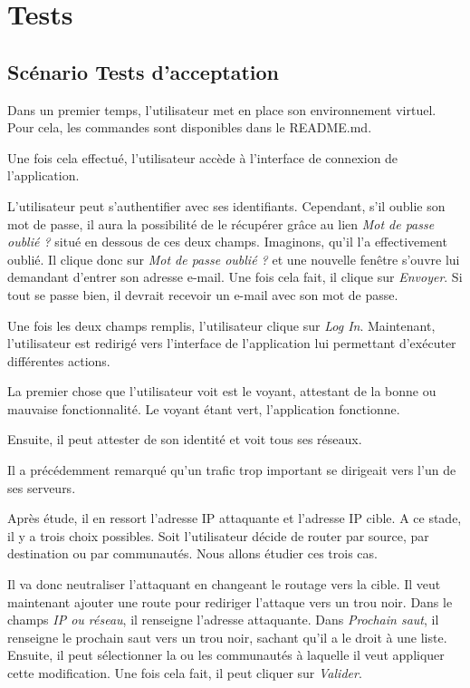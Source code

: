 \chapter{Tests}

\section{Scénario Tests d'acceptation}
Dans un premier temps, l'utilisateur met en place son environnement virtuel. Pour cela, les commandes sont disponibles dans le README.md. 

Une fois cela effectué, l'utilisateur accède à l'interface de connexion de l'application.

L'utilisateur peut s'authentifier avec ses identifiants. Cependant, s'il oublie son mot de passe, il aura la possibilité de le récupérer grâce au lien \textit{Mot de passe oublié ?} situé en dessous de ces deux champs. Imaginons, qu'il l'a effectivement oublié. Il clique donc sur \textit{Mot de passe oublié ?} et une nouvelle fenêtre s'ouvre lui demandant d'entrer son adresse e-mail. Une fois cela fait, il clique sur \textit{Envoyer}. Si tout se passe bien, il devrait recevoir un e-mail avec son mot de passe.

Une fois les deux champs remplis, l'utilisateur clique sur \textit{Log In}. Maintenant, l'utilisateur est redirigé vers l'interface de l'application lui permettant d'exécuter différentes actions. 

La premier chose que l'utilisateur voit est le voyant, attestant de la bonne ou mauvaise fonctionnalité. Le voyant étant vert, l'application fonctionne.

Ensuite, il peut attester de son identité et voit tous ses réseaux.

Il a précédemment remarqué qu'un trafic trop important se dirigeait vers l'un de ses serveurs. 

Après étude, il en ressort l'adresse IP attaquante et l'adresse IP cible. A ce stade, il y a trois choix possibles. Soit l'utilisateur décide de router par source, par destination ou par communautés. Nous allons étudier ces trois cas.

Il va donc neutraliser l'attaquant en changeant le routage vers la cible. Il veut maintenant ajouter une route pour rediriger l'attaque vers un trou noir. Dans le champs \textit{IP ou réseau}, il renseigne l'adresse attaquante. Dans \textit{Prochain saut}, il renseigne le prochain saut vers un trou noir, sachant qu'il a le droit à une liste. Ensuite, il peut sélectionner la ou les communautés à laquelle il veut appliquer cette modification. Une fois cela fait, il peut cliquer sur \textit{Valider}.


